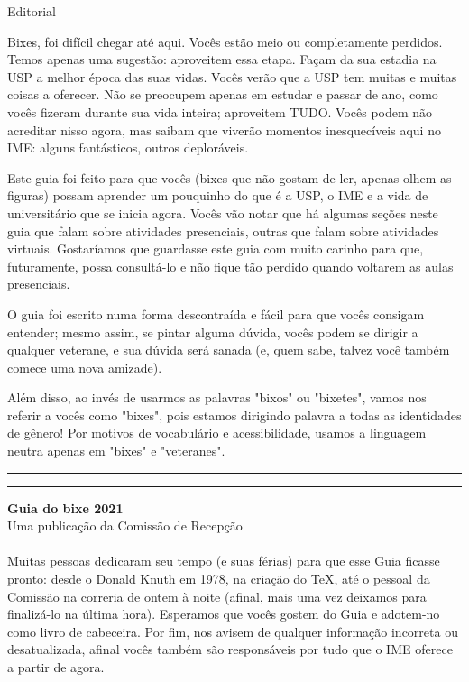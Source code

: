 \begin{editorial}{Editorial}

Bixes, foi difícil chegar até aqui. Vocês
estão meio ou completamente perdidos. Temos apenas uma sugestão: aproveitem essa
etapa.  Façam da sua estadia na USP a melhor época das suas vidas. Vocês verão
que a USP tem muitas e muitas coisas a oferecer. Não se preocupem apenas em
estudar e passar de ano, como vocês fizeram durante sua vida inteira; aproveitem
TUDO. Vocês podem não acreditar nisso agora, mas saibam que viverão momentos
inesquecíveis aqui no IME: alguns fantásticos, outros deploráveis.

Este guia foi feito para que vocês (bixes que não gostam de ler, apenas olhem as figuras)
possam aprender um pouquinho do que é a USP,
o IME e a vida de universitário que se inicia agora. Vocês vão notar que há algumas seções neste
guia que falam sobre atividades presenciais, outras que falam sobre atividades virtuais.
Gostaríamos que guardasse este guia com muito carinho para que, futuramente, possa consultá-lo
e não fique tão perdido quando voltarem as aulas presenciais. %

O guia foi escrito numa forma
descontraída e fácil para que vocês consigam entender; mesmo assim, se pintar
alguma dúvida, vocês podem se dirigir a qualquer veterane, e sua dúvida será
sanada (e, quem sabe, talvez você também comece uma nova amizade).

Além disso, ao invés de usarmos as palavras "bixos" ou "bixetes", vamos nos referir
a vocês como "bixes", pois estamos dirigindo palavra a todas as identidades de 
gênero! Por motivos de vocabulário e acessibilidade, usamos a linguagem neutra 
apenas em "bixes" e "veteranes".


\rule{\textwidth}{0.5ex}\rule{2ex}{0.5ex}

{\large\bf Guia do bixe 2021} \\
Uma publicação da Comissão de Recepção

\paragraph{}
Muitas pessoas dedicaram seu tempo (e suas férias) para que esse Guia ficasse
pronto: desde o Donald Knuth em 1978, na criação do \TeX\makebox{}, até o
pessoal da Comissão na correria de ontem à noite (afinal, mais uma vez
deixamos para finalizá-lo na última hora). Esperamos que vocês gostem do Guia
e adotem-no como livro de cabeceira. Por fim, nos avisem de qualquer informação
incorreta ou desatualizada, afinal vocês também são responsáveis por tudo que o
IME oferece a partir de agora.


\end{editorial}
